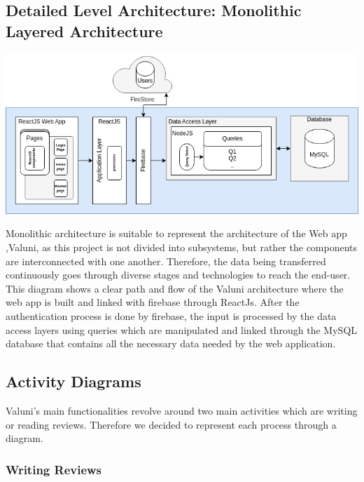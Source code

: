 \documentclass{article}
\begin{document}
\subsection{Detailed Level Architecture: Monolithic Layered Architecture} 
\begin{center}
\includegraphics[scale=0.65]{../Diagrams/MonolithicArch.png}
\end{center}

\quad Monolithic architecture is suitable to represent the architecture of the Web app ,Valuni, as this project is not divided into subsystems, but rather the components are interconnected with one another. Therefore, the data being transferred continuously goes through diverse stages and technologies to reach the end-user. This diagram shows a clear path and flow of the Valuni architecture where the web app is built and linked with firebase through ReactJs. After the authentication process is done by firebase, the input is processed by the data access layers using queries which are manipulated and linked through the MySQL database that contains all the necessary data needed by the web application.

\subsection{Activity Diagrams}  

Valuni’s main functionalities revolve around two main activities which are writing or reading reviews. Therefore we decided to represent each process through a diagram.  

\subsubsection{Writing Reviews} 
\end{document}
